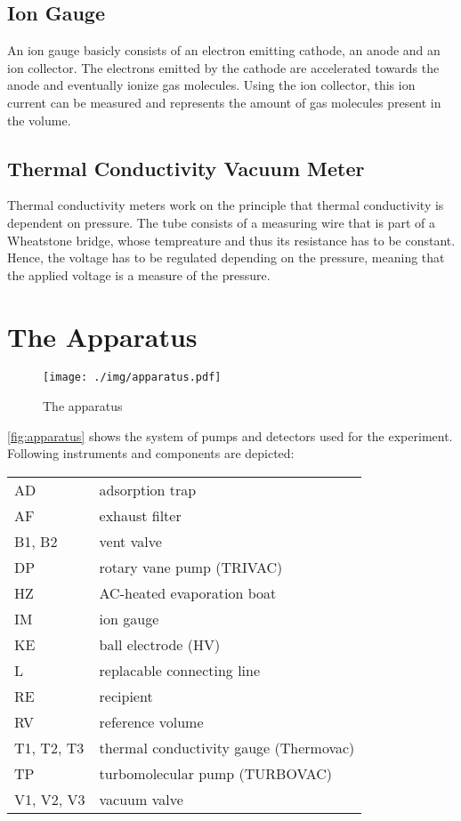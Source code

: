 \subsection{Ion Gauge}
An ion gauge basicly consists of an electron emitting cathode, an anode and an ion collector.
The electrons emitted by the cathode are accelerated towards the anode and eventually ionize gas molecules.
Using the ion collector, this ion current can be measured and represents the amount of gas molecules present in the volume.

\subsection{Thermal Conductivity Vacuum Meter}
Thermal conductivity meters work on the principle that thermal conductivity is dependent on pressure.
The tube consists of a measuring wire that is part of a Wheatstone bridge, whose tempreature and thus its resistance has to be constant.
Hence, the voltage has to be regulated depending on the pressure, meaning that the applied voltage is a measure of the pressure.

\section{The Apparatus}
\begin{figure}[tbp]
	\centering
	\texttt{[image: ./img/apparatus.pdf]}
	\caption[The apparatus]{The apparatus}
	\label{fig:apparatus}
\end{figure}
\autoref{fig:apparatus} shows the system of pumps and detectors used for the experiment. Following instruments and components are depicted:
\begin{table}[h!]
	\centering
	\begin{tabular}{ll}
		AD & adsorption trap	\\
		AF & exhaust filter	\\
		B1, B2 & vent valve\\
		DP & rotary vane pump (TRIVAC)	\\
		HZ & AC-heated evaporation boat	\\
		IM & ion gauge	\\
		KE & ball electrode (HV)	\\
		L & replacable connecting line	\\
		RE & recipient	\\
		RV & reference volume	\\
		T1, T2, T3 & thermal conductivity gauge (Thermovac)	\\
		TP & turbomolecular pump (TURBOVAC)	\\
		V1, V2, V3 & vacuum valve	\\
	\end{tabular}
\end{table}

